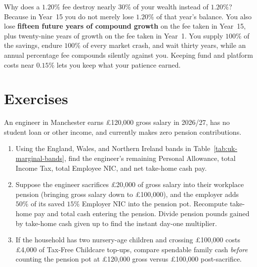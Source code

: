 \begin{intuitionbox}
Why does a $1.20\%$ fee destroy nearly $30\%$ of your wealth instead of $1.20\%$? Because in Year~15 you do not merely lose $1.20\%$ of that year's balance. You also lose \textbf{fifteen future years of compound growth} on the fee taken in Year~15, plus twenty-nine years of growth on the fee taken in Year~1. You supply $100\%$ of the savings, endure $100\%$ of every market crash, and wait thirty years, while an annual percentage fee compounds silently against you. Keeping fund and platform costs near $0.15\%$ lets you keep what your patience earned.
\end{intuitionbox}

\section*{Exercises}

\begin{exercise}
An engineer in Manchester earns \pounds 120,000 gross salary in 2026/27, has no student loan or other income, and currently makes zero pension contributions.
\begin{enumerate}[label=(\alph*)]
  \item Using the England, Wales, and Northern Ireland bands in Table~\ref{tab:uk-marginal-bands}, find the engineer's remaining Personal Allowance, total Income Tax, total Employee NIC, and net take-home cash pay.
  \item Suppose the engineer sacrifices \pounds 20,000 of gross salary into their workplace pension (bringing gross salary down to \pounds 100,000), and the employer adds \textbf{$50\%$} of its saved $15\%$ Employer NIC into the pension pot. Recompute take-home pay and total cash entering the pension. Divide pension pounds gained by take-home cash given up to find the instant day-one multiplier.
  \item If the household has two nursery-age children and crossing \pounds 100,000 costs \pounds 4,000 of Tax-Free Childcare top-ups, compare spendable family cash \emph{before} counting the pension pot at \pounds 120,000 gross versus \pounds 100,000 post-sacrifice.
\end{enumerate}
\end{exercise}

